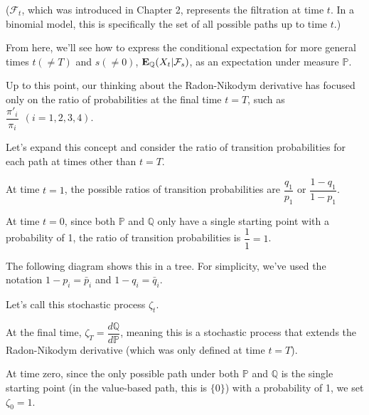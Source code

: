 \documentclass[uplatex,a4j,12pt,dvipdfmx]{jsarticle}
\begin{document}
($\mathcal{F}_{t}$, which was introduced in Chapter 2, represents the filtration at time $t$. In a binomial model, this is specifically the set of all possible paths up to time $t$.)

From here, we'll see how to express the conditional expectation for more general times $t(\neq T)$ and $s(\neq 0)$, ${\bf E}_{\mathbb{Q}}(X_{t} | \mathcal{F}_{s} )$, as an expectation under measure $\mathbb{P}$.
${}$

Up to this point, our thinking about the Radon-Nikodym derivative has focused only on the ratio of probabilities at the final time $t=T$, such as $\dfrac{ \pi'_{i} }{ \pi_{i} } \ \ (i=1,2,3,4)$.

Let's expand this concept and consider the ratio of transition probabilities for each path at times other than $t=T$.

At time $t=1$, the possible ratios of transition probabilities are $\dfrac{ q_{1} }{ p_{1} }$ or $\dfrac{ 1 - q_{1} }{ 1 - p_{1} }$.

At time $t=0$, since both $\mathbb{P}$ and $\mathbb{Q}$ only have a single starting point with a probability of 1, the ratio of transition probabilities is $\dfrac{1}{1} = 1$.

The following diagram shows this in a tree. For simplicity, we've used the notation $1-p_{i} = \bar{p}_{i}$ and $1-q_{i} = \bar{q}_{i}$.

Let's call this stochastic process $\zeta_{t}$.

At the final time, $\zeta_{T} = \dfrac{ d \mathbb{Q} }{ d \mathbb{P} }$, meaning this is a stochastic process that extends the Radon-Nikodym derivative (which was only defined at time $t=T$).

At time zero, since the only possible path under both $\mathbb{P}$ and $\mathbb{Q}$ is the single starting point (in the value-based path, this is $\{ 0 \}$) with a probability of 1, we set $\zeta_{0} = 1$.
\end{document}
